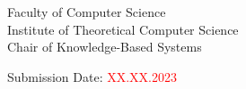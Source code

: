 \begin{titlepage}
\begin{doublespace}
    			\vspace{0.5cm}
    		
    			Faculty of Computer Science \\
    			Institute of Theoretical Computer Science \\
    			Chair of Knowledge-Based Systems
    		
    			\vspace{1cm}
    		
    			Submission Date: \textcolor{red}{XX.XX.2023}
    			
                  
	\end{doublespace}
	
            
\end{titlepage}